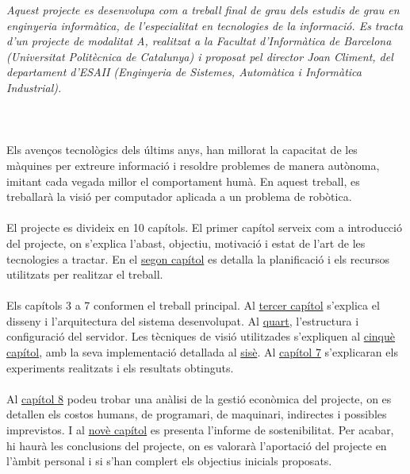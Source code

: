 \textit{Aquest projecte es desenvolupa com a treball final de grau dels estudis de grau en enginyeria informàtica, de l'especialitat en tecnologies de la informació.
Es tracta d'un projecte de modalitat A, realitzat a la Facultat d'Informàtica de Barcelona (Universitat Politècnica de Catalunya) i proposat pel director Joan Climent,
del departament d'ESAII (Enginyeria de Sistemes, Automàtica i Informàtica Industrial).}\\\\\\\\
Els avenços tecnològics dels últims anys, han millorat la capacitat de les màquines per extreure informació i resoldre problemes de manera autònoma, imitant cada vegada millor
el comportament humà. En aquest treball, es treballarà la visió per computador aplicada a un problema de robòtica.\\\\
El projecte es divideix en 10 capítols. El primer capítol serveix com a introducció del projecte, on s'explica l'abast, objectiu, motivació i estat de l'art de les tecnologies a tractar.
En el \hyperref[sec:Planificacio]{segon capítol} es detalla la planificació i els recursos utilitzats per realitzar el treball.\\\\
Els capítols 3 a 7 conformen el treball principal. Al \hyperref[sec:Disseny]{tercer capítol} s'explica el disseny i l'arquitectura del sistema desenvolupat. Al \hyperref[sec:Servidor]{quart},
l'estructura i configuració del servidor. Les tècniques de visió utilitzades s'expliquen al \hyperref[sec:Tecniques]{cinquè capítol}, amb la seva implementació detallada al \hyperref[sec:Implementacio]{sisè}.
Al \hyperref[sec:Resultats]{capítol 7} s'explicaran els experiments realitzats i els resultats obtinguts.\\\\
Al \hyperref[sec:Costos]{capítol 8} podeu trobar una anàlisi de la gestió econòmica del projecte, on es detallen els costos humans, de programari, de maquinari, indirectes i possibles imprevistos.
I al \hyperref[sec:Sostenibilitat]{novè capítol} es presenta l'informe de sostenibilitat. Per acabar, hi haurà les conclusions del projecte, on es valorarà l'aportació del projecte en l'àmbit personal
i si s'han complert els objectius inicials proposats.

